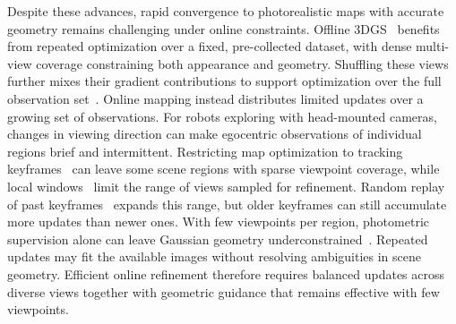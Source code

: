 

Despite these advances, rapid convergence to photorealistic maps with accurate geometry remains challenging under online constraints.
Offline 3DGS~\cite{kerbl20233dgs} benefits from repeated optimization over a fixed, pre-collected dataset, with dense multi-view coverage constraining both appearance and geometry.
Shuffling these views further mixes their gradient contributions to support optimization over the full observation set~\cite{bottou2012sgd}.
Online mapping instead distributes limited updates over a growing set of observations.
For robots exploring with head-mounted cameras, changes in viewing direction can make egocentric observations of individual regions brief and intermittent.
Restricting map optimization to tracking keyframes~\cite{huang2024photoslam} can leave some scene regions with sparse viewpoint coverage, while local windows~\cite{zhang2025hislam2} limit the range of views sampled for refinement.
Random replay of past keyframes~\cite{rtgslam2024} expands this range, but older keyframes can still accumulate more updates than newer ones.
With few viewpoints per region, photometric supervision alone can leave Gaussian geometry underconstrained~\cite{sparsegs}.
Repeated updates may fit the available images without resolving ambiguities in scene geometry.
Efficient online refinement therefore requires balanced updates across diverse views together with geometric guidance that remains effective with few viewpoints.



